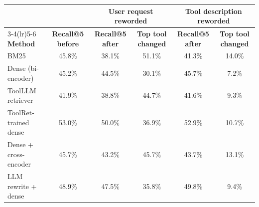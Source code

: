 \begin{tabular}{lccccc}
\toprule
 & & \multicolumn{2}{c}{\textbf{User request reworded}} & \multicolumn{2}{c}{\textbf{Tool description reworded}} \\
\cmidrule(lr){3-4}\cmidrule(lr){5-6}
\textbf{Method} & \textbf{Recall@5 before} & \textbf{Recall@5 after} & \textbf{Top tool changed} & \textbf{Recall@5 after} & \textbf{Top tool changed} \\
\midrule
BM25 & 45.8\% & 38.1\% & 51.1\% & 41.3\% & 14.0\% \\
Dense (bi-encoder) & 45.2\% & 44.5\% & 30.1\% & 45.7\% & 7.2\% \\
ToolLLM retriever & 41.9\% & 38.8\% & 44.7\% & 41.6\% & 9.3\% \\
ToolRet-trained dense & 53.0\% & 50.0\% & 36.9\% & 52.9\% & 10.7\% \\
Dense + cross-encoder & 45.7\% & 43.2\% & 45.7\% & 43.7\% & 13.1\% \\
LLM rewrite + dense & 48.9\% & 47.5\% & 35.8\% & 49.8\% & 9.4\% \\
\bottomrule
\end{tabular}
